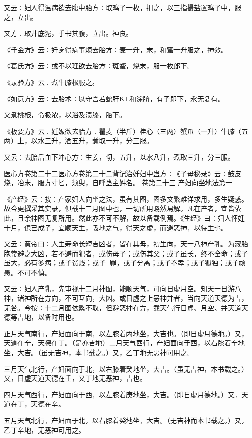 \documentclass[a4paper,12pt,UTF8,twoside]{ctexbook}
\begin{document}
又云∶妇人得温病欲去腹中胎方∶取鸡子一枚，扣之，以三指撮盐置鸡子中，服之，立出。

又方∶取井底泥，手书其腹，立出。神良。

《千金方》云∶妊身得病事烦去胎方∶麦一升，末，和蜜一升服之，神效。

《葛氏方》云∶或不以理欲去胎方∶斑蝥，烧末，服一枚郎下。

《录验方》云∶煮牛膝根服之。

《如意方》云∶去胎术∶以守宫若蛇肝KT和涂脐，有子即下，永无复有。

又煮桃根，令极浓，以浴及渍膝，胎下。

《极要方》云∶妊娠欲去胎方∶瞿麦（半斤）桂心（三两）蟹爪（一升）牛膝（五两）上，以水三升，酒五升，煮取一升，分三服。

又云∶去胎后血下冲心方∶生姜，切，五升，以水八升，煮取三升，分三服。

医心方卷第二十二医心方卷第二十二背记治妊妇中蛊方∶《子母秘录》云∶鼓皮烧，冶末，服方寸匕，须臾，自呼蛊主姓名。
卷第二十三
产妇向坐地法第一

《产经》云∶按∶产家妇人向坐之法，虽有其图，图多文繁难详求用，多生疑惑。故今更撰采其实录，俱载十二月图中也，一切所用晓然易解。凡在产者，宜皆依此，且余神图无复所用。然此亦不可不解，故以备载例焉。《生经》曰∶妇人怀妊十月，俱已成子，宜顺天生，吸地之气，得天之虚，而避恶神，以待生也。

又云∶黄帝曰∶人生寿命长短吉凶者，皆在其母，初生向，天一八神产乳。为藏胎胞常避之大凶，若不避而犯者，或伤母子；或伤其父；或子虽长，终不全命；或子虽大，必有多病；或子贫贱；或子□罪，或子分离；或子不孝；或子狐独；或子顽愚。不可不慎。

又云∶妇人产乳，先审视十二月神图，能顺天气，可向日虚月空。知天一日游八神，诸神所在方向，不可互向，大凶。或日虚之上恶神并者，当向天道天德为吉，无咎。今按∶十二月图依繁不取，但避恶神在方，载天气行日虚、月空、并天道天德等吉地，以备时用也。

正月天气南行，产妇面向于南，以左膝着丙地坐，大吉也。（即日虚月德地。）又，天道在辛，天德在丁。（是亦吉地）二月天气西行，产妇面向于西，以右膝着辛地坐，大吉。（虽无吉神，本书载之。）又，乙丁地无恶神可用之。

三月天气北行，产妇面向于北，以右膝着癸地坐，大吉。（虽无吉神，本书载之。）又，日虚天道天德在壬，又丁地无恶神，吉也。

四月天气西行，产妇面向于西，以左膝着庚地坐，大吉。（即日虚月德地。）又，天道在丁，天德在辛。

五月天气北行，产妇面于北，以右膝着癸地坐，大吉。（无吉神而本书载之。）又，乙丁辛地，无恶神可用之。
\end{document}
